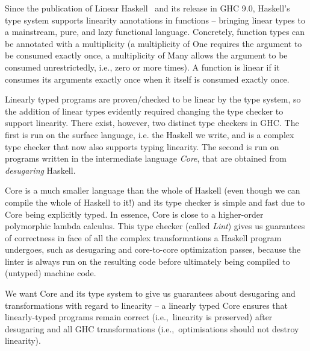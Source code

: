 \documentclass[]{lwnovathesis}
\begin{document}
Since the publication of Linear Haskell~\cite{cite:linearhaskell} and its release in GHC 9.0,
Haskell's type system supports linearity annotations in functions -- bringing
linear types to a mainstream, pure, and lazy functional language. Concretely,
function types can be annotated with a multiplicity (a multiplicity of One
requires the argument to be consumed exactly once, a multiplicity of Many allows
the argument to be consumed unrestrictedly, i.e., zero or more times). A
function is linear if it consumes its arguments exactly once when it itself is
consumed exactly once.

Linearly typed programs are proven/checked to be linear by the type system, so
the addition of linear types evidently required changing the type checker to
support linearity. There exist, however, two distinct type checkers in GHC.
The first is run on the surface language, i.e. the Haskell we write, and is a
complex type checker that now also supports typing linearity. The second is
run on programs written in the intermediate language \emph{Core}, that
are obtained from \emph{desugaring} Haskell.

Core is a much smaller language than the whole of Haskell (even though we
can compile the whole of Haskell to it!) and its type checker is
simple and fast due to Core being explicitly typed. In essence, Core
is close to a higher-order polymorphic lambda calculus. This type
checker (called \emph{Lint}) gives us guarantees of correctness in face of all
the complex transformations a Haskell program undergoes, such as desugaring and
core-to-core optimization passes, because the linter is always run on the resulting code
before ultimately being compiled to (untyped) machine code.


We want Core and its type system to give us guarantees about
desugaring and transformations with regard to linearity -- a linearly
typed Core ensures that linearly-typed programs remain correct
(i.e.,~linearity is preserved) after desugaring and all GHC
transformations (i.e.,~optimisations should not destroy linearity).
\end{document}
